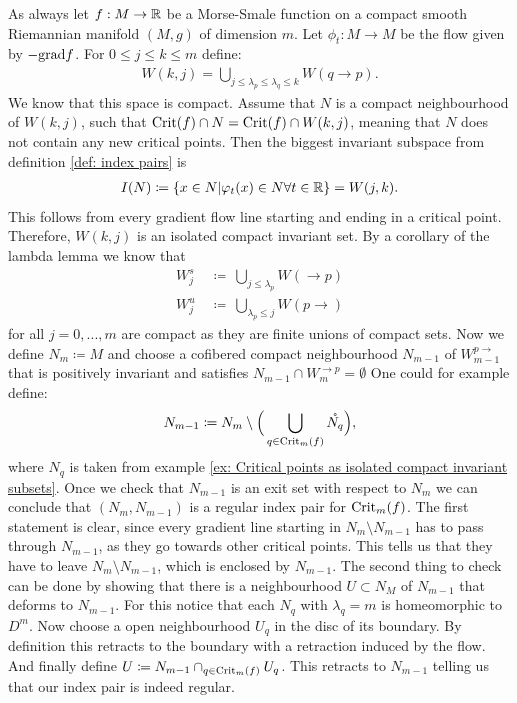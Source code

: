 \begin{definition} \label{def: Regular index pairs and a filtration on M } \label{def: Regular index pairs and a filtration on M}
As always let $f:M\to \mathbb{R}$ be a Morse-Smale function on a compact smooth Riemannian manifold $(M,g)$ of dimension $m$. Let $\phi_t:M\to M$ be the flow given by $-\mathrm{grad} f$. For $0\leq j\leq k\leq m$ define:
\begin{align*}
    W(k,j)=\bigcup_{j\leq \lambda_p \leq \lambda_q\leq k} W(q \to p).
\end{align*}We know that this space is compact. Assume that $N$ is a compact neighbourhood of $W(k,j)$, such that $\mathrm{Crit}(f)\cap N=\mathrm{Crit}(f)\cap W(k , j)$, meaning that $N$ does not contain any new critical points. Then the biggest invariant subspace from definition \ref{def: index pairs} is
\begin{align*}
    I(N)\coloneq\{x\in N| \varphi_t(x)\in N \forall t \in \mathbb{R} \}=W(j,k).
\end{align*} This follows from every gradient flow line starting and ending in a critical point.  Therefore, $W(k,j)$ is an isolated compact invariant set. By a corollary of the lambda lemma  we know that 
\begin{align*}
    W^{s}_{j}&~\coloneq~ \bigcup_{j\leq \lambda_p}W(\to p)\\
    W^{u}_{ j}&~\coloneq~\bigcup_{\lambda_p\leq j}W(p \to )
\end{align*}for all $j=0,...,m$ are compact as they are finite unions of compact sets. Now we define $N_m\coloneq M$ and choose a cofibered compact neighbourhood $N_{m-1}$ of $W^{p\to }_{m-1}$ that is positively invariant and satisfies $N_{m-1}\cap W^{\to p}_m=\emptyset$
One could for example define:
\begin{align*}
    N_{m-1}\coloneq N_m \setminus \Big(\bigcup_{q\in \mathrm{Crit}_m(f)}  \mathring{N_q}\Big),
\end{align*} where $N_q$ is taken from example \ref{ex: Critical points as isolated compact invariant subsets}. Once we check that $N_{m-1}$ is an exit set with respect to $N_m$ we can conclude that $(N_m,N_{m-1})$ is a regular index pair for $\mathrm{Crit}_m(f)$. The first statement is clear, since every gradient line starting in $N_m\setminus N_{m-1}$ has to pass through $N_{m-1}$, as they go towards other critical points. This tells us that they have to leave $N_m\setminus N_{m-1}$, which is enclosed by $N_{m-1}$. The second thing to check can be done by showing that there is a neighbourhood $U\subset N_M$ of $N_{m-1}$ that deforms to $N_{m-1}$. For this notice that each $N_q$ with $\lambda_q=m$ is homeomorphic to $D^m$. Now choose a open neighbourhood $U_q$ in the disc of its boundary. By definition this retracts to the boundary with a retraction induced by the flow. And finally define $U\coloneq N_{m-1}\cap_{q\in \mathrm{Crit}_m(f)} U_q$. This retracts to $N_{m-1}$ telling us that our index pair is indeed regular. 


\end{definition}

